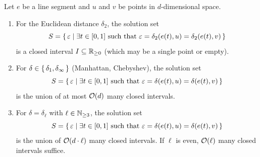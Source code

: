 \begin{lemma}\label{lem:event_counts}
  Let \(e\) be a line segment and \(u\) and \(v\) be points in \(d\)-dimensional space.
	\begin{enumerate}
		\item For the Euclidean distance \(\delta_2\), the solution set
			\[S = \set{\varepsilon \mid \exists t \in [0, 1] \text{ such that } \varepsilon = \delta_2(e(t), u) = \delta_2(e(t), v)}\]
			is a closed interval \(I \subseteq \mathbb{R}_{\geq 0}\) (which may be a single point or empty).

		\item For \(\delta \in \set{\delta_1, \delta_\infty}\) (Manhattan, Chebyshev), the solution set
			\[S = \set{\varepsilon \mid \exists t \in [0, 1] \text{ such that } \varepsilon = \delta(e(t), u) = \delta(e(t), v)}\]
			is the union of at most \(\mathcal{O}(d)\) many closed intervals.

		\item For \(\delta = \delta_\ell\) with \(\ell \in \mathbb{N}_{\geq 3}\), the solution set
			\[S = \set{\varepsilon \mid \exists t \in [0, 1] \text{ such that } \varepsilon = \delta(e(t), u) = \delta(e(t), v)}\]
			is the union of \(\mathcal{O}(d \cdot \ell)\) many closed intervals. If \(\ell\) is even, \(\mathcal{O}(\ell)\) many closed intervals suffice.
	\end{enumerate}
\end{lemma}

